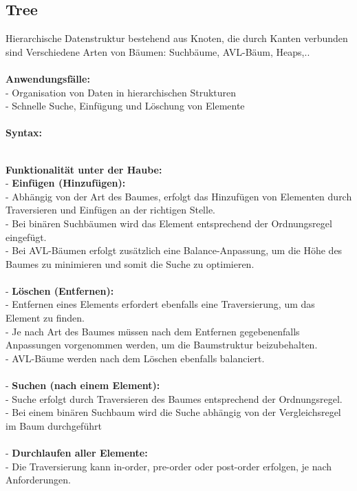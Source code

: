\documentclass[../main.tex]{subfiles}
\begin{document}
	\subsection{Tree}
	Hierarchische Datenstruktur bestehend aus Knoten, die durch Kanten verbunden sind
	Verschiedene Arten von Bäumen: Suchbäume, AVL-Bäum, Heaps,..\\\\
	\textbf{Anwendungsfälle:}\\
	- Organisation von Daten in hierarchischen Strukturen\\
	- Schnelle Suche, Einfügung und Löschung von Elemente\\\\
	\textbf{Syntax:}
	 
	\\
	\textbf{Funktionalität unter der Haube:}\\
	- \textbf{Einfügen (Hinzufügen):}\\
	\quad - Abhängig von der Art des Baumes, erfolgt das Hinzufügen von Elementen durch Traversieren und Einfügen an der richtigen Stelle.\\
	\quad - Bei binären Suchbäumen wird das Element entsprechend der Ordnungsregel eingefügt.\\
	\quad - Bei AVL-Bäumen erfolgt zusätzlich eine Balance-Anpassung, um die Höhe des Baumes zu minimieren und somit die Suche zu optimieren.\\\\
	- \textbf{Löschen (Entfernen):}\\
	\quad - Entfernen eines Elements erfordert ebenfalls eine Traversierung, um das Element zu finden.\\
	\quad - Je nach Art des Baumes müssen nach dem Entfernen gegebenenfalls Anpassungen vorgenommen werden, um die Baumstruktur beizubehalten.\\
	\quad - AVL-Bäume werden nach dem Löschen ebenfalls balanciert.\\\\
	- \textbf{Suchen (nach einem Element):}\\
	\quad - Suche erfolgt durch Traversieren des Baumes entsprechend der Ordnungsregel.\\
	\quad - Bei einem binären Suchbaum wird die Suche abhängig von der Vergleichsregel im Baum durchgeführt\\\\
	- \textbf{Durchlaufen aller Elemente:}\\
	\quad - Die Traversierung kann in-order, pre-order oder post-order erfolgen, je nach Anforderungen.\\
\end{document}
